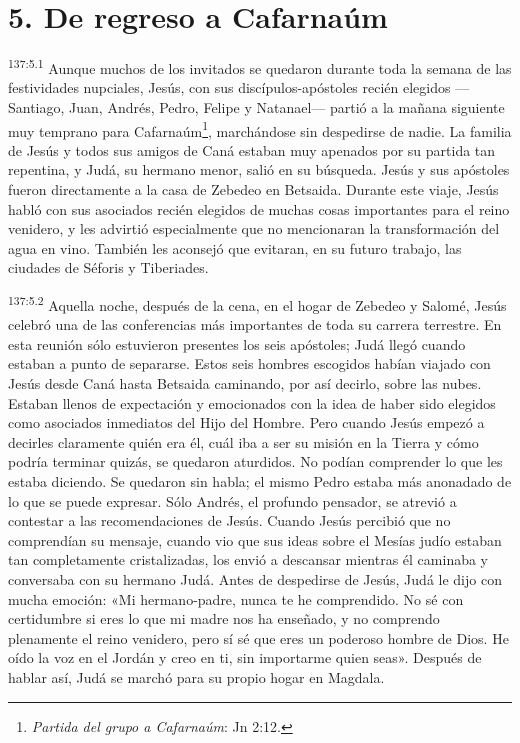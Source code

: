 \section*{5. De regreso a Cafarnaúm}
\par
\textsuperscript{137:5.1} Aunque muchos de los invitados se quedaron durante toda la semana de las festividades nupciales, Jesús, con sus discípulos-apóstoles recién elegidos ---Santiago, Juan, Andrés, Pedro, Felipe y Natanael--- partió a la mañana siguiente muy temprano para Cafarnaúm\footnote{\textit{Partida del grupo a Cafarnaúm}: Jn 2:12.}, marchándose sin despedirse de nadie. La familia de Jesús y todos sus amigos de Caná estaban muy apenados por su partida tan repentina, y Judá, su hermano menor, salió en su búsqueda. Jesús y sus apóstoles fueron directamente a la casa de Zebedeo en Betsaida. Durante este viaje, Jesús habló con sus asociados recién elegidos de muchas cosas importantes para el reino venidero, y les advirtió especialmente que no mencionaran la transformación del agua en vino. También les aconsejó que evitaran, en su futuro trabajo, las ciudades de Séforis y Tiberiades.

\par
\textsuperscript{137:5.2} Aquella noche, después de la cena, en el hogar de Zebedeo y Salomé, Jesús celebró una de las conferencias más importantes de toda su carrera terrestre. En esta reunión sólo estuvieron presentes los seis apóstoles; Judá llegó cuando estaban a punto de separarse. Estos seis hombres escogidos habían viajado con Jesús desde Caná hasta Betsaida caminando, por así decirlo, sobre las nubes. Estaban llenos de expectación y emocionados con la idea de haber sido elegidos como asociados inmediatos del Hijo del Hombre. Pero cuando Jesús empezó a decirles claramente quién era él, cuál iba a ser su misión en la Tierra y cómo podría terminar quizás, se quedaron aturdidos. No podían comprender lo que les estaba diciendo. Se quedaron sin habla; el mismo Pedro estaba más anonadado de lo que se puede expresar. Sólo Andrés, el profundo pensador, se atrevió a contestar a las recomendaciones de Jesús. Cuando Jesús percibió que no comprendían su mensaje, cuando vio que sus ideas sobre el Mesías judío estaban tan completamente cristalizadas, los envió a descansar mientras él caminaba y conversaba con su hermano Judá. Antes de despedirse de Jesús, Judá le dijo con mucha emoción: «Mi hermano-padre, nunca te he comprendido. No sé con certidumbre si eres lo que mi madre nos ha enseñado, y no comprendo plenamente el reino venidero, pero sí sé que eres un poderoso hombre de Dios. He oído la voz en el Jordán y creo en ti, sin importarme quien seas». Después de hablar así, Judá se marchó para su propio hogar en Magdala.

